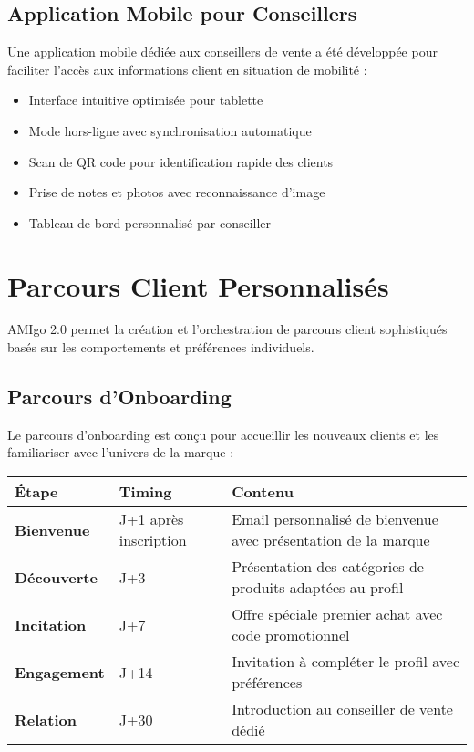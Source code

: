 \subsection{Application Mobile pour Conseillers}

\begin{mdframed}[backgroundcolor=lightgreen!20, linewidth=1pt]
Une application mobile dédiée aux conseillers de vente a été développée pour faciliter l'accès aux informations client en situation de mobilité :

\begin{itemize}
    \item Interface intuitive optimisée pour tablette
    \item Mode hors-ligne avec synchronisation automatique
    \item Scan de QR code pour identification rapide des clients
    \item Prise de notes et photos avec reconnaissance d'image
    \item Tableau de bord personnalisé par conseiller
\end{itemize}
\end{mdframed}

\section{Parcours Client Personnalisés}

AMIgo 2.0 permet la création et l'orchestration de parcours client sophistiqués basés sur les comportements et préférences individuels.

\subsection{Parcours d'Onboarding}

Le parcours d'onboarding est conçu pour accueillir les nouveaux clients et les familiariser avec l'univers de la marque :

\begin{center}
\begin{tabular}{|>{\bfseries}p{3cm}|p{3cm}|p{7.5cm}|}
\hline
\rowcolor{lightblue} Étape & Timing & Contenu \\
\hline
Bienvenue & J+1 après inscription & Email personnalisé de bienvenue avec présentation de la marque \\
\hline
Découverte & J+3 & Présentation des catégories de produits adaptées au profil \\
\hline
Incitation & J+7 & Offre spéciale premier achat avec code promotionnel \\
\hline
Engagement & J+14 & Invitation à compléter le profil avec préférences \\
\hline
Relation & J+30 & Introduction au conseiller de vente dédié \\
\hline
\end{tabular}
\end{center}

